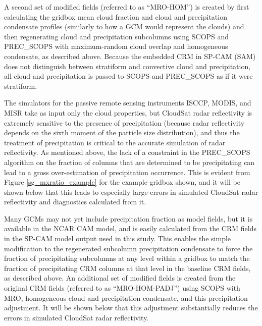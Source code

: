 A second set of modified fields (referred to as ``MRO-HOM'') is created by first calculating the gridbox mean cloud fraction and cloud and precipitation condensate profiles (similarly to how a GCM would represent the clouds) and then regenerating cloud and precipitation subcolumns using SCOPS and PREC\_SCOPS with maximum-random cloud overlap and homogeneous condensate, as described above. Because the embedded CRM in SP-CAM (SAM) does not distinguish between stratiform and convective cloud and precipitation, all cloud and precipitation is passed to SCOPS and PREC\_SCOPS as if it were stratiform.

The simulators for the passive remote sensing instruments ISCCP, MODIS, and MISR take as input only the cloud properties, but CloudSat radar reflectivity is extremely sensitive to the presence of precipitation (because radar reflectivity depends on the sixth moment of the particle size distribution), and thus the treatment of precipitation is critical to the accurate simulation of radar reflectivity. As mentioned above, the lack of a constraint in the PREC\_SCOPS algorithm on the fraction of columns that are determined to be precipitating can lead to a gross over-estimation of precipitation occurrence. This is evident from Figure \ref{sg_mxratio_example} for the example gridbox shown, and it will be shown below that this leads to especially large errors in simulated CloudSat radar reflectivity and diagnostics calculated from it.

Many GCMs may not yet include precipitation fraction as model fields, but it is available in the NCAR CAM model, and is easily calculated from the CRM fields in the SP-CAM model output used in this study. This enables the simple modification to the regenerated subcolumn precipitation condensate to force the fraction of precipitating subcolumns at any level within a gridbox to match the fraction of precipitating CRM columns at that level in the baseline CRM fields, as described above. An additional set of modified fields is created from the original CRM fields (referred to as ``MRO-HOM-PADJ'') using SCOPS with MRO, homogeneous cloud and precipitation condensate, and this precipitation adjustment. It will be shown below that this adjustment substantially reduces the errors in simulated CloudSat radar reflectivity.


